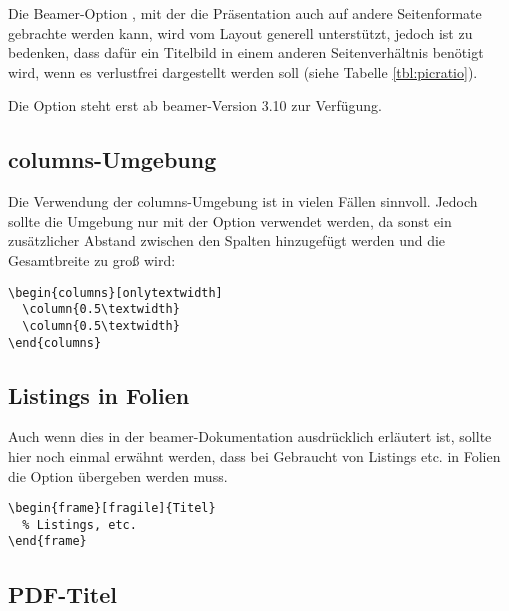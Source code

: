 Die Beamer-Option , mit der die Präsentation auch auf
andere Seitenformate gebrachte werden kann, wird vom Layout generell
unterstützt, jedoch ist zu bedenken, dass dafür ein Titelbild in einem anderen
Seitenverhältnis benötigt wird, wenn es verlustfrei dargestellt werden soll
(siehe Tabelle \ref{tbl:picratio}).

\begin{hint}
Die Option  steht erst ab beamer-Version 3.10
zur Verfügung.
\end{hint}


\subsection{columns-Umgebung}

Die Verwendung der columns-Umgebung ist in vielen Fällen sinnvoll.
Jedoch sollte die Umgebung nur mit der Option 
verwendet werden, da sonst ein zusätzlicher Abstand zwischen den
Spalten hinzugefügt werden und die Gesamtbreite zu groß wird:

\begin{lstlisting}[morekeywords={onlytextwidth},keywordstyle=\color{tuOrange}]
\begin{columns}[onlytextwidth]
  \column{0.5\textwidth}
  \column{0.5\textwidth}
\end{columns}
\end{lstlisting}


\subsection{Listings in Folien}

Auch wenn dies in der beamer-Dokumentation ausdrücklich erläutert ist,
sollte hier noch einmal erwähnt werden, dass bei Gebraucht von Listings etc.
in Folien die Option  übergeben werden muss.

\begin{lstlisting}[morekeywords={fragile},keywordstyle=\color{tuOrange}]
\begin{frame}[fragile]{Titel}
  % Listings, etc.
\end{frame}
\end{lstlisting}



\subsection{PDF-Titel}

